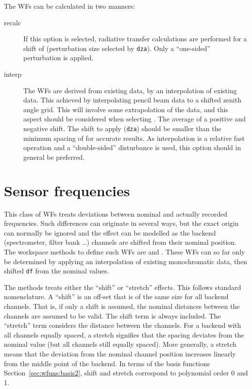 The WFs can be calculated in two manners:
\begin{description}
\item[recalc] If this option is selected, radiative transfer calculations are
  performed for a shift of  (perturbation size selected
  by \verb|dza|). Only a ``one-sided'' perturbation is applied.
\item[interp] The WFs are derived from existing data, by an interpolation of
  existing data. This achieved by interpolating pencil beam data to a shifted
  zenith angle grid. This will involve some extrapolation of the data, and this
  aspect should be considered when selecting . The
  average of a positive and negative shift. The shift to apply (\verb|dza|)
  should be smaller than the minimum spacing of 
  for accurate results. As interpolation is a relative fast operation and a
  ``double-sided'' disturbance is used, this option should in general be
  preferred.
\end{description}




\section{Sensor frequencies}
\label{sec:wfuns:sensorfreq}

This class of WFs treats deviations between nominal and actually recorded
frequencies. Such differences can originate in several ways, but the exact
origin can normally be ignored and the effect can be modelled as the backend
(spectrometer, filter bank \dots) channels are shifted from their nominal
position. The workspace methods to define such WFs are
 and . These
WFs can so far only be determined by applying an interpolation of existing
monochromatic data, then shifted \verb|df| from the nominal
values.

The methods treats either the ``shift'' or ``stretch'' effects. This follows
standard nomenclature. A ``shift'' is an off-set that is of the same size for
all backend channels. That is, if only a shift is assumed, the nominal
distances between the channels are assumed to be valid. The shift term is
always included. The ``stretch'' term considers the distance between the
channels. For a backend with all channels equally spaced, a stretch signifies
that the spacing deviates from the nominal value (but all channels still
equally spaced). More generally, a stretch means that the deviation from the
nominal channel position increases linearly from the middle point of the
backend. In terms of the basis functions Section~\ref{sec:wfuns:basis2}, shift
and stretch correspond to polynomial order 0 and 1.

